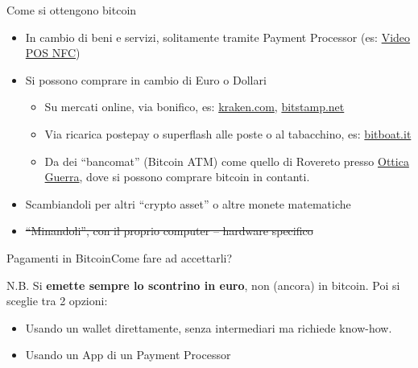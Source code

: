 \documentclass[english,compress]{beamer}
\begin{document}
\begin{frame}{Come si ottengono bitcoin}
   \begin{itemize}
    \item In cambio di beni e servizi, solitamente tramite Payment Processor (es: \href{https://youtu.be/GydkZrgv-YA}{Video POS NFC})
    \item Si possono comprare in cambio di Euro o Dollari
    \begin{itemize}
    
      \item Su mercati online, via bonifico, es: \href{https://www.kraken.com/charts}{kraken.com}, \href{https://www.bitstamp.net/market/tradeview/}{bitstamp.net}
      \item Via ricarica postepay o superflash alle poste o al tabacchino, es: \href{https://www.bitboat.net/it/buy}{bitboat.it}
      \item Da dei ``bancomat'' (Bitcoin ATM) come quello di Rovereto presso \href{https://twitter.com/mammadori/status/576505253564166145}{Ottica Guerra}, dove
      si possono comprare bitcoin in contanti.
    \end{itemize}
    \item Scambiandoli per altri ``crypto asset'' o altre monete matematiche
    \item {\st{``Minandoli'', con il proprio computer -- hardware specifico}}
  \end{itemize}

\end{frame}

\begin{frame}{Pagamenti in Bitcoin}{Come fare ad accettarli?}

N.B. Si \textbf{emette sempre lo scontrino in euro}, non (ancora) in bitcoin. Poi si sceglie tra 2 opzioni:

\begin{itemize}

 \item Usando un wallet direttamente, senza intermediari ma richiede know-how.
 \item Usando un App di un Payment Processor
\end{itemize}
\end{frame}
\end{document}
